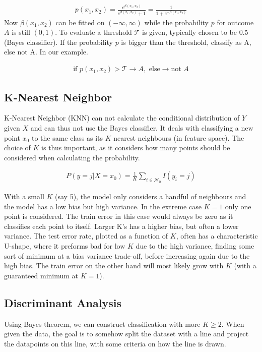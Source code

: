 \documentclass{article}
\begin{document}
\begin{align*}
    p(x_1, x_2) = \frac{e^{\beta(x_1,x_2)}}{e^{\beta(x_1,x_2)}+1} = \frac{1}{1+e^{-\beta(x_1,x_2)}}
\end{align*}
Now $\beta(x_1,x_2)$ can be fitted on $(-\infty, \infty)$ while the probability $p$ for outcome $A$ is still $(0,1)$. To evaluate a threshold $\mathcal{T}$ is given, typically chosen to be 0.5 (Bayes classifier). If the probability $p$ is bigger than the threshold, classify as A, else not A. In our example.

\begin{align*}
    \text{if } p(x_1, x_2) > \mathcal{T} \rightarrow A, \text{     else} \rightarrow \text{not } A 
\end{align*}

\subsection{K-Nearest Neighbor}
K-Nearest Neighbor (KNN) can not calculate the conditional distribution of $Y$ given $X$ and can thus not use the Bayes classifier. It deals with classifying a new point $x_0$ to the same class as its $K$ nearest neighbours (in feature space). The choice of $K$ is thus important, as it considers how many points should be considered when calculating the probability. 

\begin{align*}
    P(y=j|X=x_0) = \frac{1}{K} \sum_{i \in \mathcal{N}_0} I(y_i=j)
\end{align*}

With a small $K$ (say 5), the model only considers a handful of neighbours and the model has a low bias but high variance. In the extreme case $K=1$ only one point is considered. The train error in this case would always be zero as it classifies each point to itself. Larger K's has a higher bias, but often a lower variance. The test error rate, plotted as a function of $K$, often has a characteristic U-shape, where it preforms bad for low $K$ due to the high variance, finding some sort of minimum at a bias variance trade-off, before increasing again due to the high bias. The train error on the other hand will most likely grow with $K$ (with a guaranteed minimum at $K=1$).

\subsection{Discriminant Analysis}
Using Bayes theorem, we can construct classification with more $K \geq 2$. When given the data, the goal is to somehow split the dataset with a line and project the datapoints on this line, with some criteria on how the line is drawn. 
\end{document}
